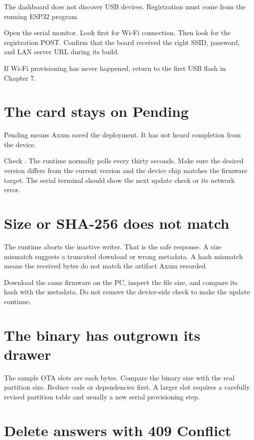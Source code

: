 The dashboard does not discover USB devices. Registration must come from the running ESP32 program.

Open the serial monitor. Look first for Wi-Fi connection. Then look for the registration POST. Confirm that the board received the right SSID, password, and LAN server URL during its build.

If Wi-Fi provisioning has never happened, return to the first USB flash in Chapter 7.

\section{The card stays on Pending}

Pending means Axum saved the deployment. It has not heard completion from the device.

Check . The runtime normally polls every thirty seconds. Make sure the desired version differs from the current version and the device chip matches the firmware target. The serial terminal should show the next update check or its network error.

\section{Size or SHA-256 does not match}

The runtime aborts the inactive writer. That is the safe response. A size mismatch suggests a truncated download or wrong metadata. A hash mismatch means the received bytes do not match the artifact Axum recorded.

Download the same firmware on the PC, inspect the file size, and compare its hash with the metadata. Do not remove the device-side check to make the update continue.

\section{The binary has outgrown its drawer}

The sample OTA slots are each  bytes. Compare the binary size with the real partition size. Reduce code or dependencies first. A larger slot requires a carefully revised partition table and usually a new serial provisioning step.

\section{Delete answers with 409 Conflict}

